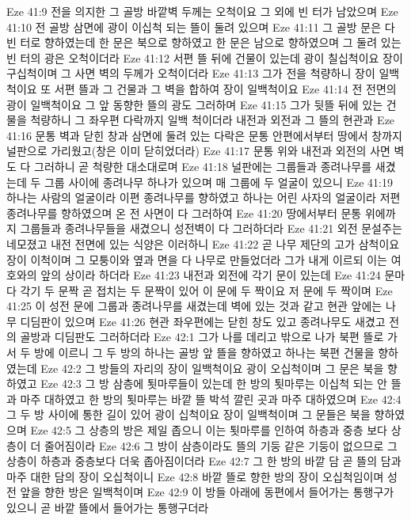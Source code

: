 Eze 41:9  전을 의지한 그 골방 바깥벽 두께는 오척이요 그 외에 빈 터가 남았으며
Eze 41:10  전 골방 삼면에 광이 이십척 되는 뜰이 둘려 있으며
Eze 41:11  그 골방 문은 다 빈 터로 향하였는데 한 문은 북으로 향하였고 한 문은 남으로 향하였으며 그 둘려 있는 빈 터의 광은 오척이더라
Eze 41:12  서편 뜰 뒤에 건물이 있는데 광이 칠십척이요 장이 구십척이며 그 사면 벽의 두께가 오척이더라
Eze 41:13  그가 전을 척량하니 장이 일백척이요 또 서편 뜰과 그 건물과 그 벽을 합하여 장이 일백척이요
Eze 41:14  전 전면의 광이 일백척이요 그 앞 동향한 뜰의 광도 그러하며
Eze 41:15  그가 뒷뜰 뒤에 있는 건물을 척량하니 그 좌우편 다락까지 일백 척이더라 내전과 외전과 그 뜰의 현관과
Eze 41:16  문통 벽과 닫힌 창과 삼면에 둘려 있는 다락은 문통 안편에서부터 땅에서 창까지 널판으로 가리웠고(창은 이미 닫히었더라)
Eze 41:17  문통 위와 내전과 외전의 사면 벽도 다 그러하니 곧 척량한 대소대로며
Eze 41:18  널판에는 그룹들과 종려나무를 새겼는데 두 그룹 사이에 종려나무 하나가 있으며 매 그룹에 두 얼굴이 있으니
Eze 41:19  하나는 사람의 얼굴이라 이편 종려나무를 향하였고 하나는 어린 사자의 얼굴이라 저편 종려나무를 향하였으며 온 전 사면이 다 그러하여
Eze 41:20  땅에서부터 문통 위에까지 그룹들과 종려나무들을 새겼으니 성전벽이 다 그러하더라
Eze 41:21  외전 문설주는 네모졌고 내전 전면에 있는 식양은 이러하니
Eze 41:22  곧 나무 제단의 고가 삼척이요 장이 이척이며 그 모퉁이와 옆과 면을 다 나무로 만들었더라 그가 내게 이르되 이는 여호와의 앞의 상이라 하더라
Eze 41:23  내전과 외전에 각기 문이 있는데
Eze 41:24  문마다 각기 두 문짝 곧 접치는 두 문짝이 있어 이 문에 두 짝이요 저 문에 두 짝이며
Eze 41:25  이 성전 문에 그룹과 종려나무를 새겼는데 벽에 있는 것과 같고 현관 앞에는 나무 디딤판이 있으며
Eze 41:26  현관 좌우편에는 닫힌 창도 있고 종려나무도 새겼고 전의 골방과 디딤판도 그러하더라
Eze 42:1  그가 나를 데리고 밖으로 나가 북편 뜰로 가서 두 방에 이르니 그 두 방의 하나는 골방 앞 뜰을 향하였고 하나는 북편 건물을 향하였는데
Eze 42:2  그 방들의 자리의 장이 일백척이요 광이 오십척이며 그 문은 북을 향하였고
Eze 42:3  그 방 삼층에 툇마루들이 있는데 한 방의 툇마루는 이십척 되는 안 뜰과 마주 대하였고 한 방의 툇마루는 바깥 뜰 박석 깔린 곳과 마주 대하였으며
Eze 42:4  그 두 방 사이에 통한 길이 있어 광이 십척이요 장이 일백척이며 그 문들은 북을 향하였으며
Eze 42:5  그 상층의 방은 제일 좁으니 이는 툇마루를 인하여 하층과 중층 보다 상층이 더 줄어짐이라
Eze 42:6  그 방이 삼층이라도 뜰의 기둥 같은 기둥이 없으므로 그 상층이 하층과 중층보다 더욱 좁아짐이더라
Eze 42:7  그 한 방의 바깥 담 곧 뜰의 담과 마주 대한 담의 장이 오십척이니
Eze 42:8  바깥 뜰로 향한 방의 장이 오십척임이며 성전 앞을 향한 방은 일백척이며
Eze 42:9  이 방들 아래에 동편에서 들어가는 통행구가 있으니 곧 바깥 뜰에서 들어가는 통행구더라
